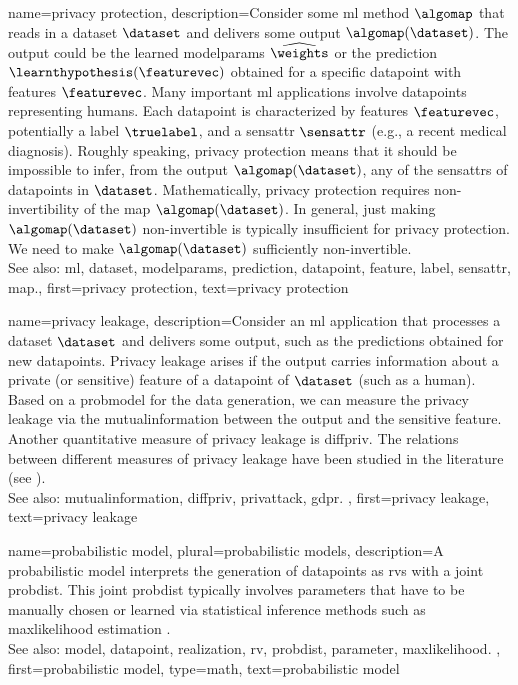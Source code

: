 {name={privacy protection},
     description={Consider some \gls{ml} method $\algomap$ that reads 
	 	in a \gls{dataset} $\dataset$ and delivers some output $\algomap(\dataset)$. The output 
	 	could be the learned \glspl{modelparam} $\widehat{\weights}$ or the \gls{prediction} 
	 	$\learnthypothesis(\featurevec)$ obtained for a specific \gls{datapoint} with \glspl{feature} 
	 	$\featurevec$. Many important \gls{ml} applications involve \glspl{datapoint} 
		representing humans. Each \gls{datapoint} is characterized by \glspl{feature} $\featurevec$, 
		potentially a \gls{label} $\truelabel$, and a \gls{sensattr} $\sensattr$ (e.g., a recent medical diagnosis). 
		Roughly speaking, privacy protection means that it should be impossible to infer, from the output $\algomap(\dataset)$, 
		any of the \glspl{sensattr} of \glspl{datapoint} in $\dataset$. Mathematically, privacy protection requires non-invertibility 
		of the \gls{map} $\algomap(\dataset)$. In general, just making $\algomap(\dataset)$ non-invertible 
		is typically insufficient for privacy protection. We need to make $\algomap(\dataset)$ sufficiently non-invertible. 
					\\ 
		See also: \gls{ml}, \gls{dataset}, \glspl{modelparam}, \gls{prediction}, \gls{datapoint}, \gls{feature}, \gls{label}, \gls{sensattr}, \gls{map}.}, 
	first={privacy protection}, 
	text={privacy protection} 
}

{name={privacy leakage},
	description={Consider an \gls{ml} application that processes a 
		\gls{dataset} $\dataset$ and delivers some output, such as the \glspl{prediction} 
		obtained for new \glspl{datapoint}. Privacy leakage arises 
		if the output carries information about a private (or sensitive) \gls{feature} of 
		a \gls{datapoint} of $\dataset$ (such as a human). Based on a \gls{probmodel} 
		for the \gls{data} generation, we can measure the privacy leakage via the \gls{mutualinformation} 
		between the output and the sensitive \gls{feature}. Another quantitative measure of privacy leakage 
		is \gls{diffpriv}. The relations between different measures of privacy leakage have been 
		studied in the literature (see \cite{InfThDiffPriv}). 
				\\ 
		See also: \gls{mutualinformation}, \gls{diffpriv}, \gls{privattack}, \gls{gdpr}. }, 
	first={privacy leakage}, 
	text={privacy leakage} 
}


{name={probabilistic model}, plural={probabilistic models},
	description={A probabilistic \gls{model} interprets the 
	             generation of \glspl{datapoint} as \glspl{rv} with a joint \gls{probdist}. 
				This joint \gls{probdist} typically involves \glspl{parameter} that have to 
				be manually chosen or learned via statistical inference methods such as 
				\gls{maxlikelihood} estimation \cite{LC}.
					\\ 
		See also: \gls{model}, \gls{datapoint}, \gls{realization}, \gls{rv}, \gls{probdist}, \gls{parameter}, \gls{maxlikelihood}. }, 
	first={probabilistic model}, 
	type=math,
	text={probabilistic model} 
}


